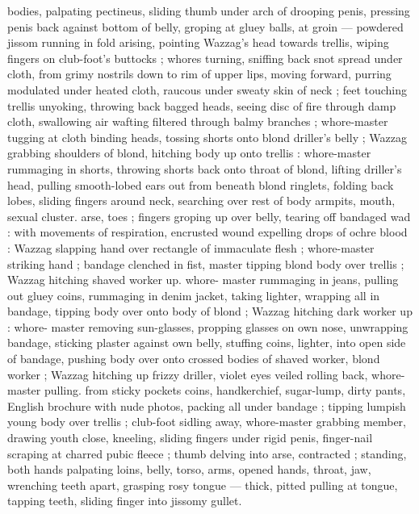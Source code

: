 bodies, palpating pectineus, sliding thumb under arch of drooping 
penis, pressing penis back against bottom of belly, groping at gluey 
balls, at groin --- powdered jissom running in fold {\dashcom} arising, 
pointing Wazzag's head towards trellis, wiping fingers on club-foot's 
buttocks ; whores turning, sniffing back snot spread under cloth, 
from grimy nostrils down to rim of upper lips, moving forward, 
purring modulated under heated cloth, raucous under sweaty skin of 
neck ; feet touching trellis {\col} unyoking, throwing back bagged heads, 
seeing disc of fire through damp cloth, swallowing air wafting filtered 
through balmy branches ; whore-master tugging at cloth binding 
heads, tossing shorts onto blond driller's belly ; Wazzag grabbing 
shoulders of blond, hitching body up onto trellis : whore-master 
rummaging in shorts, throwing shorts back onto throat of blond, 
lifting driller's head, pulling smooth-lobed ears out from beneath 
blond ringlets, folding back lobes, sliding fingers around neck, 
searching over rest of body {\col} armpits, mouth, sexual cluster. arse, 
toes ; fingers groping up over belly, tearing off bandaged wad : with 
movements of respiration, encrusted wound expelling drops of ochre 
blood : Wazzag slapping hand over rectangle of immaculate flesh ; 
whore-master striking hand ; bandage clenched in fist, master tipping 
blond body over trellis ; Wazzag hitching shaved worker up. whore- 
master rummaging in jeans, pulling out gluey coins, rummaging in 
denim jacket, taking lighter, wrapping all in bandage, tipping body 
over onto body of blond ; Wazzag hitching dark worker up : whore- 
master removing sun-glasses, propping glasses on own nose, 
unwrapping bandage, sticking plaster against own belly, stuffing 
coins, lighter, into open side of bandage, pushing body over onto 
crossed bodies of shaved worker, blond worker ; Wazzag hitching up 
frizzy driller, violet eyes veiled rolling back, whore-master pulling. 
from sticky pockets {\col} coins, handkerchief, sugar-lump, dirty pants, 
English brochure with nude photos, packing all under bandage ; 
tipping lumpish young body over trellis ; club-foot sidling away, 
whore-master grabbing member, drawing youth close, kneeling, 
sliding fingers under rigid penis, finger-nail scraping at charred 
pubic fleece ; thumb delving into arse, contracted ; standing, both 
hands palpating loins, belly, torso, arms, opened hands, throat, jaw,
wrenching teeth apart, grasping rosy tongue --- thick, pitted {\dashcom}
pulling at tongue, tapping teeth, sliding finger into jissomy gullet. 
